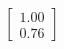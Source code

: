 \documentclass[preview]{standalone}
\begin{document}
\begin{align*}
\begin{bmatrix} 1.00 \\ 0.76 \end{bmatrix}
\end{align*}
\end{document}
